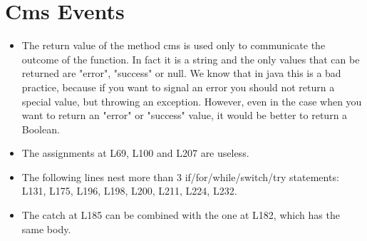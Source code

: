 \section{Cms Events}
\begin{itemize}
\item The return value of the method cms is used only to communicate the outcome of the function. In fact it is a string and the only values that can be returned are "error", "success" or null. We know that in java this is a bad practice, because if you want to signal an error you should not return a special value, but throwing an exception. However, even in the case when you want to return an "error" or "success" value, it would be better to return a Boolean.
\item The assignments at L69, L100 and L207 are useless.
\item The following lines nest more than 3 if/for/while/switch/try statements: L131, L175, L196, L198, L200, L211, L224, L232.
\item The catch at L185 can be combined with the one at L182, which has the same body.
\end{itemize}
